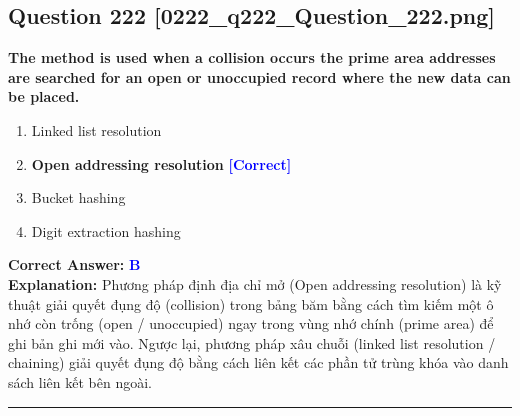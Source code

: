 \documentclass[11pt,a4paper]{article}
\begin{document}
\begin{minipage}{\textwidth}
\subsection*{Question 222 \quad \footnotesize{[0222\_q222\_Question\_222.png]}}
\noindent \textbf{The method is used when a collision occurs the prime area addresses are searched for an open or unoccupied record where the new data can be placed.}

\begin{enumerate}[label=\Alph*.]
    \item Linked list resolution
    \item \textbf{Open addressing resolution} \hfill \textcolor{blue}{\textbf{[Correct]}}
    \item Bucket hashing
    \item Digit extraction hashing
\end{enumerate}

\noindent \textbf{Correct Answer:} \textcolor{blue}{\textbf{B}} \\[2pt]
\noindent \textbf{Explanation:} Phương pháp định địa chỉ mở (Open addressing resolution) là kỹ thuật giải quyết đụng độ (collision) trong bảng băm bằng cách tìm kiếm một ô nhớ còn trống (open / unoccupied) ngay trong vùng nhớ chính (prime area) để ghi bản ghi mới vào. Ngược lại, phương pháp xâu chuỗi (linked list resolution / chaining) giải quyết đụng độ bằng cách liên kết các phần tử trùng khóa vào danh sách liên kết bên ngoài.

\par\vspace{0.3cm}
\hrule
\vspace{0.3cm}
\end{minipage}
\end{document}
